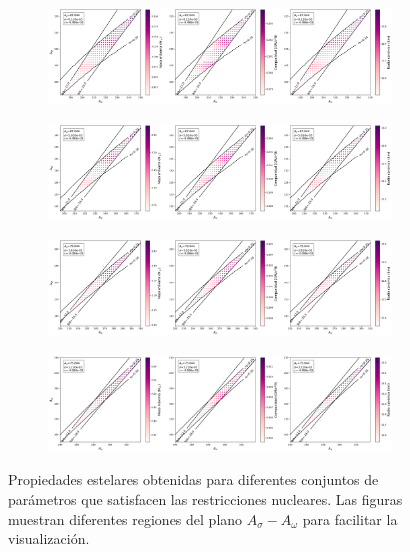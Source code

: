 \begin{figure}[h]
    \centering
    \begin{subfigure}{\linewidth}
        \centering
        \includegraphics[width=0.99\linewidth]{Figuras/props_estelar_2}
        \caption{}
        \label{fig:props_estelar_2}
    \end{subfigure}
    
    \begin{subfigure}{\linewidth}
        \centering
        \includegraphics[width=0.99\linewidth]{Figuras/props_estelar_1}
        \caption{}
        \label{fig:props_estelar_1}
    \end{subfigure}
    
    \begin{subfigure}{\linewidth}
        \centering
        \includegraphics[width=0.99\linewidth]{Figuras/props_estelar_3}
        \caption{}
        \label{fig:props_estelar_3}
    \end{subfigure}
    
    \begin{subfigure}{\linewidth}
        \centering
        \includegraphics[width=0.99\linewidth]{Figuras/props_estelar_4}
        \caption{}
        \label{fig:props_estelar_4}
    \end{subfigure}
    \caption[Propiedades estelares para diferentes conjuntos de parámetros]{Propiedades estelares obtenidas para diferentes conjuntos de parámetros que satisfacen las restricciones nucleares. Las figuras muestran diferentes regiones del plano $A_\sigma - A_\omega$ para facilitar la visualización.}
    \label{fig:props_estelares}
\end{figure}
\clearpage


